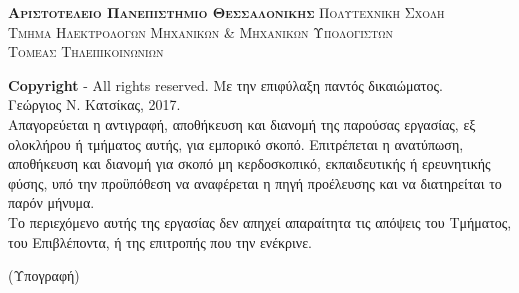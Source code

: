 \begin{center}
{\scshape\LARGE \textbf{Αριστοτελειο Πανεπιστημιο Θεσσαλονικης} Πολυτεχνικη Σχολη\\ Τμημα Ηλεκτρολογων Μηχανικων \& Μηχανικων Υπολογιστων\\ Τομεας Τηλεπικοινωνιων\par}
\end{center}

\vspace{30mm}

\begin{flushleft}
\textcopyright \textbf{Copyright} - All rights reserved. Με την επιφύλαξη παντός δικαιώματος.\\
Γεώργιος Ν. Κατσίκας, 2017.\\[12pt]

    Απαγορεύεται η αντιγραφή, αποθήκευση και διανομή της παρούσας εργασίας, εξ
    ολοκλήρου ή τμήματος αυτής, για εμπορικό σκοπό.  Επιτρέπεται η ανατύπωση,
    αποθήκευση και διανομή για σκοπό μη κερδοσκοπικό, εκπαιδευτικής ή
    ερευνητικής φύσης, υπό την προϋπόθεση να αναφέρεται η πηγή προέλευσης και να
    διατηρείται το παρόν μήνυμα.
    \\[24pt]
    Το περιεχόμενο αυτής της εργασίας δεν απηχεί απαραίτητα τις απόψεις του Τμήματος, του Επιβλέποντα, ή της επιτροπής που την ενέκρινε.\\[24pt]
\begin{minipage}{0.25\linewidth}
    \centering
    (Υπογραφή)
    \\
    \vspace{5mm}
  \end{minipage}%
  \end{flushleft}